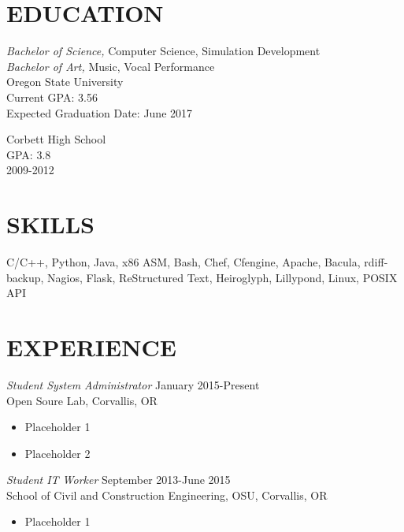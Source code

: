 \documentclass[line,margin]{res}
\begin{document}
\address{404 NW 12th Street, Corvallis, OR 97330}
\address{tfahl.com, github.com/fahlmant} 
\begin{resume}
 
\section{EDUCATION}
                    {\sl Bachelor of Science,} Computer Science, Simulation Development \\
                    {\sl Bachelor of Art,} Music, Vocal Performance \\
                    Oregon State University\\
                    Current GPA: 3.56\\
                    Expected Graduation Date: June 2017 
                    
                    Corbett High School\\
                    GPA: 3.8\\
                    2009-2012
\section{SKILLS}
                    C/C++, Python, Java, x86 ASM,
                    Bash, Chef, Cfengine, Apache, Bacula, rdiff-backup,
                    Nagios, Flask, ReStructured Text, Heiroglyph, Lillypond,
                    Linux, POSIX API
\section{EXPERIENCE}
                    {\sl Student System Administrator} \hfill January 2015-Present \\
                    Open Soure Lab, 
                    Corvallis, OR
                    \begin{itemize}  \itemsep -2pt %
                       \item Placeholder 1 
                       \item Placeholder 2 
                    \end{itemize}
 
                    {\sl Student IT Worker} \hfill September 2013-June 2015 \\
                    School of Civil and Construction Engineering, OSU, 
                    Corvallis, OR 
                    \begin{itemize}  \itemsep -2pt %
                       \item Placeholder 1 
                    \end{itemize} 


\end{resume}
\end{document}
